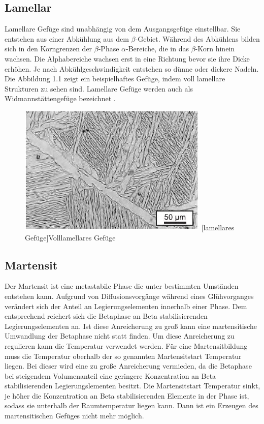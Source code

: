 \documentclass[a4paper, 11pt]{tubsreprt}
\begin{document}
\subsection{Lamellar}
Lamellare Gefüge sind unabhängig von dem Ausgangsgefüge einstellbar. Sie entstehen aus einer Abkühlung aus dem $\beta$-Gebiet. Während des Abkühlens bilden sich in den Korngrenzen der $\beta$-Phase $\alpha$-Bereiche, die in das $\beta$-Korn hinein wachsen. Die Alphabereiche wachsen erst in eine Richtung bevor sie ihre Dicke erhöhen. Je nach Abkühlgeschwindigkeit entstehen so dünne oder dickere Nadeln. Die Abbildung 1.1 zeigt ein beispielhaftes Gefüge, indem voll lamellare Strukturen zu sehen sind. Lamellare Gefüge werden auch als Widmannstättengefüge bezeichnet \cite{Luetjering2007}.


\begin{figure}
	\centering
		\includegraphics[scale=1]{Bilder/lamellar.jpg}
		[lamellares Gefüge]{Volllamellares Gefüge \cite{Leyens2002}}
		\label{lamellar}
		
\end{figure}
\subsection{Martensit}
Der Martensit ist eine metastabile Phase die unter bestimmten Umständen entstehen kann. Aufgrund von Diffusionsvorgänge während eines Glühvorganges verändert sich der Anteil an Legierungselementen innerhalb einer Phase. Dem entsprechend reichert sich die Betaphase an Beta stabilisierenden Legierungselementen an. Ist diese Anreicherung zu groß kann eine martensitische Umwandlung der Betaphase nicht statt finden. Um diese Anreicherung zu regulieren kann die Temperatur verwendet werden. Für eine Martensitbildung muss die Temperatur oberhalb der so genannten Martensitstart Temperatur liegen. Bei dieser wird eine zu große Anreicherung vermieden, da die Betaphase bei steigendem Volumenanteil eine geringere Konzentration an Beta stabilisierenden Legierungslementen besitzt. Die Martensitstart Temperatur sinkt, je höher die Konzentration an Beta stabilisierenden Elemente in der Phase ist, sodass sie unterhalb der Raumtemperatur liegen kann. Dann ist ein Erzeugen des martensitischen Gefüges nicht mehr möglich.
\end{document}
